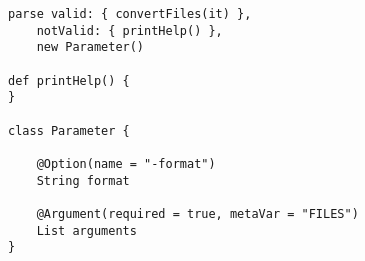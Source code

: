 \begin{lstlisting}[style=Groovybash, label={lst:example_arguments_parse}, title={%
\Command{parse} command: parse command line arguments; valid and not-valid 
closures are called depending on whether the arguments are valid.}]
parse valid: { convertFiles(it) },
    notValid: { printHelp() },
    new Parameter()
    
def printHelp() {
}

class Parameter {

    @Option(name = "-format")
    String format

    @Argument(required = true, metaVar = "FILES")
    List arguments
}

\end{lstlisting}

